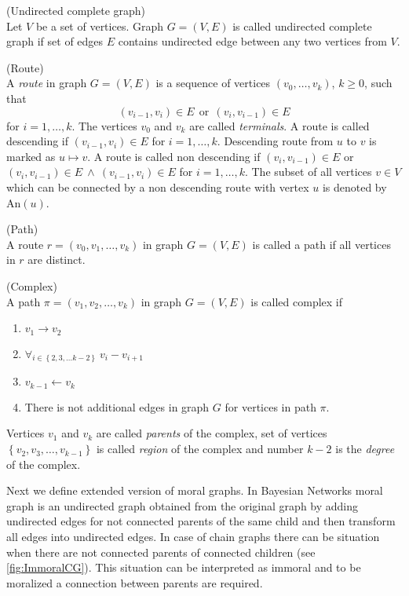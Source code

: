 \begin{defi} (Undirected complete graph) \\ 
	Let $V$ be a set of vertices. Graph $G = (V, E)$ is called undirected complete graph if set of edges $E$ 
	contains undirected edge between any two vertices from $V$.
\end{defi}

\begin{defi} (Route) \\
	A \textit{route} in graph $G = (V, E)$ is a sequence of vertices $(v_0, \dots, v_k)$, $k \ge 0$, such that 
	$$ (v_{i-1}, v_i) \in E \ \  \mbox{or} \ \ (v_i, v_{i-1}) \in E$$
	for $i = 1, \dots, k$. The vertices $v_0$ and $v_k$ are called \textit{terminals}. A route is called descending
	if $(v_{i-1}, v_i) \in E$ for $i = 1, \dots, k$. Descending route from $u$ to $v$ is marked as $u \mapsto v$. 
	A route is called non descending if $(v_i, v_{i-1}) \in E$ or $(v_i, v_{i-1}) \in E \ \wedge \ (v_{i-1}, v_i) \in E$ for 
	$i = 1, \dots, k$. The subset of all vertices $v \in V$ which can be connected by a non descending route with vertex $u$ is
	denoted by $\mbox{An}(u)$.
\end{defi}


\begin{defi} (Path) \\
	A route $r = (v_0, v_1, \dots, v_k)$ in graph $G = (V, E)$ is called a path if all vertices in $r$ are distinct.
\end{defi}


\begin{defi} \label{complexDef} (Complex) \\
	A path $\pi = (v_1, v_2, \dots, v_k)$ in graph $G = (V, E)$ is called complex if
	\begin{enumerate}
		\item $v_1 \rightarrow v_2$
		\item $\forall_{i \in \left\{ 2, 3, \dots k-2 \right\}} \ v_i - v_{i+1}$
		\item $v_{k-1} \leftarrow v_k$
		\item There is not additional edges in graph $G$ for vertices in path $\pi$.
	\end{enumerate}
	Vertices $v_1$ and $v_k$ are called \textit{parents} of the complex, set of vertices 
	$\left\{v_2, v_3, \dots, v_{k-1} \right\}$ is called \textit{region} of the complex and number
	$k-2$ is the \textit{degree} of the complex.
\end{defi}
Next we define extended version of moral graphs. In Bayesian Networks moral graph is 
an undirected graph obtained from the original graph by adding undirected edges for not connected parents of the same child and then transform all edges into undirected edges. In case of chain graphs there can be situation when there are 
not connected parents of connected children (see \ref{fig:ImmoralCG}). 
This situation can be interpreted as immoral and to be moralized a connection between parents are required.


